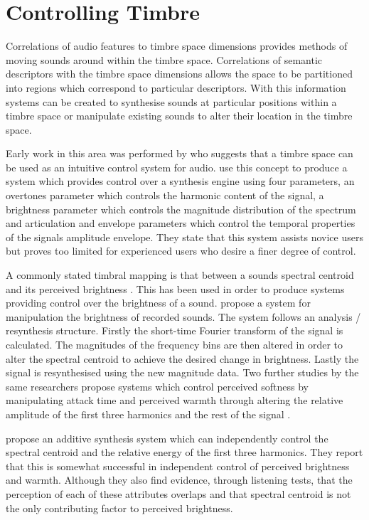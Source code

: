 \section{Controlling Timbre}
\label{sec:Timbre-Control}
	Correlations of audio features to timbre space dimensions provides methods of moving sounds around within the timbre
	space. Correlations of semantic descriptors with the timbre space dimensions allows the space to be partitioned into
	regions which correspond to particular descriptors. With this information systems can be created to synthesise
	sounds at particular positions within a timbre space or manipulate existing sounds to alter their location in the
	timbre space.

	Early work in this area was performed by \citet{wessel1979timbre} who suggests that a timbre space can be used as an
	intuitive control system for audio. \citet{vertegaal1994isee} use this concept to produce a system which provides
	control over a synthesis engine using four parameters, an overtones parameter which controls the harmonic content of
	the signal, a brightness parameter which controls the magnitude distribution of the spectrum and articulation and
	envelope parameters which control the temporal properties of the signals amplitude envelope. They state that this
	system assists novice users but proves too limited for experienced users who desire a finer degree of control.

	A commonly stated timbral mapping is that between a sounds spectral centroid and its perceived brightness
	\citep{schubert2006does}. This has been used in order to produce systems providing control over the brightness of a
	sound. \citet{williams2007perceptually} propose a system for manipulation the brightness of recorded sounds. The
	system follows an analysis / resynthesis structure. Firstly the short-time Fourier transform of the signal is
	calculated. The magnitudes of the frequency bins are then altered in order to alter the spectral centroid to achieve
	the desired change in brightness. Lastly the signal is resynthesised using the new magnitude data.  Two further
	studies by the same researchers propose systems which control perceived softness by manipulating attack time
	\citep{williams2009perceptually} and perceived warmth through altering the relative amplitude of the first three
	harmonics and the rest of the signal \citep{williams2010perceptually}.

	\citet{zacharakis2011an} propose an additive synthesis system which can independently control the spectral centroid
	and the relative energy of the first three harmonics. They report that this is somewhat successful in independent
	control of perceived brightness and warmth. Although they also find evidence, through listening tests, that the
	perception of each of these attributes overlaps and that spectral centroid is not the only contributing factor to
	perceived brightness.

